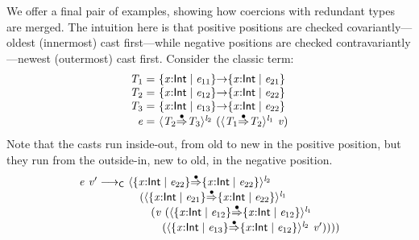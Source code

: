 \documentclass[9pt]{extarticle}
\newcommand{\ottnt}[1]{\mathit{#1}}
\begin{document}
We offer a final pair of examples, showing how
coercions with redundant types are merged. The intuition here is that
positive positions are checked covariantly---oldest (innermost) cast
first---while negative positions are checked contravariantly---newest
(outermost) cast first. Consider the classic \lambdah term:
\[ \begin{array}{r@{~}l}
  \ottnt{T_{{\mathrm{1}}}} = &   \{ \mathit{x} \mathord{:}  \mathsf{Int}  \mathrel{\mid} \ottnt{e_{{\mathrm{11}}}} \}  \mathord{ \rightarrow }  \{ \mathit{x} \mathord{:}  \mathsf{Int}  \mathrel{\mid} \ottnt{e_{{\mathrm{21}}}} \}   \\
  \ottnt{T_{{\mathrm{2}}}} = &   \{ \mathit{x} \mathord{:}  \mathsf{Int}  \mathrel{\mid} \ottnt{e_{{\mathrm{12}}}} \}  \mathord{ \rightarrow }  \{ \mathit{x} \mathord{:}  \mathsf{Int}  \mathrel{\mid} \ottnt{e_{{\mathrm{22}}}} \}   \\
  \ottnt{T_{{\mathrm{3}}}} = &   \{ \mathit{x} \mathord{:}  \mathsf{Int}  \mathrel{\mid} \ottnt{e_{{\mathrm{13}}}} \}  \mathord{ \rightarrow }  \{ \mathit{x} \mathord{:}  \mathsf{Int}  \mathrel{\mid} \ottnt{e_{{\mathrm{22}}}} \}   \\
   \ottnt{e} = &  \langle  \ottnt{T_{{\mathrm{2}}}}  \mathord{ \overset{\bullet}{\Rightarrow} }  \ottnt{T_{{\mathrm{3}}}}  \rangle^{ \ottnt{l_{{\mathrm{2}}}} } ~   (  \langle  \ottnt{T_{{\mathrm{1}}}}  \mathord{ \overset{\bullet}{\Rightarrow} }  \ottnt{T_{{\mathrm{2}}}}  \rangle^{ \ottnt{l_{{\mathrm{1}}}} } ~  \mathit{v}  )   
\end{array}
\]
Note that the casts run inside-out, from old to new in the positive
position, but they run from the outside-in, new to old, in the
negative position.
\[ \begin{array}{@{}r@{~}l@{}}
    \ottnt{e} ~ \mathit{v'}   \longrightarrow _{  \mathsf{C}  }  &  \langle   \{ \mathit{x} \mathord{:}  \mathsf{Int}  \mathrel{\mid} \ottnt{e_{{\mathrm{22}}}} \}   \mathord{ \overset{\bullet}{\Rightarrow} }   \{ \mathit{x} \mathord{:}  \mathsf{Int}  \mathrel{\mid} \ottnt{e_{{\mathrm{22}}}} \}   \rangle^{ \ottnt{l_{{\mathrm{2}}}} } ~  {} \\  &  \quad   (  \langle   \{ \mathit{x} \mathord{:}  \mathsf{Int}  \mathrel{\mid} \ottnt{e_{{\mathrm{21}}}} \}   \mathord{ \overset{\bullet}{\Rightarrow} }   \{ \mathit{x} \mathord{:}  \mathsf{Int}  \mathrel{\mid} \ottnt{e_{{\mathrm{22}}}} \}   \rangle^{ \ottnt{l_{{\mathrm{1}}}} } ~  {} \\  &  \qquad   (  \mathit{v} ~  (  \langle   \{ \mathit{x} \mathord{:}  \mathsf{Int}  \mathrel{\mid} \ottnt{e_{{\mathrm{12}}}} \}   \mathord{ \overset{\bullet}{\Rightarrow} }   \{ \mathit{x} \mathord{:}  \mathsf{Int}  \mathrel{\mid} \ottnt{e_{{\mathrm{12}}}} \}   \rangle^{ \ottnt{l_{{\mathrm{1}}}} } ~  {} \\  &  \qquad  \quad   (  \langle   \{ \mathit{x} \mathord{:}  \mathsf{Int}  \mathrel{\mid} \ottnt{e_{{\mathrm{13}}}} \}   \mathord{ \overset{\bullet}{\Rightarrow} }   \{ \mathit{x} \mathord{:}  \mathsf{Int}  \mathrel{\mid} \ottnt{e_{{\mathrm{12}}}} \}   \rangle^{ \ottnt{l_{{\mathrm{2}}}} } ~  \mathit{v'}  )   )   )   )  
\end{array} \]
\end{document}
